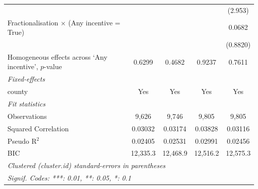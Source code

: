 \begin{tabular}{lcccc}
                                                                                            &          &          &                & (2.953)\\   
   Fractionalisation $\times$ (Any incentive = True)                                        &          &          &                & 0.0682\\   
                                                                                            &          &          &                & (0.8820)\\   
   Homogeneous effects across `Any incentive', $p$-value                                    & 0.6299   & 0.4682   & 0.9237         & 0.7611\\  
   \midrule
   \emph{Fixed-effects}\\
   county                                                                                   & Yes      & Yes      & Yes            & Yes\\  
   \midrule
   \emph{Fit statistics}\\
   Observations                                                                             & 9,626    & 9,746    & 9,805          & 9,805\\  
   Squared Correlation                                                                      & 0.03032  & 0.03174  & 0.03828        & 0.03116\\  
   Pseudo R$^2$                                                                             & 0.02405  & 0.02531  & 0.02991        & 0.02456\\  
   BIC                                                                                      & 12,335.3 & 12,468.9 & 12,516.2       & 12,575.3\\  
   \midrule \midrule
   \multicolumn{5}{l}{\emph{Clustered (cluster.id) standard-errors in parentheses}}\\
   \multicolumn{5}{l}{\emph{Signif. Codes: ***: 0.01, **: 0.05, *: 0.1}}\\
\end{tabular}
\par\endgroup


